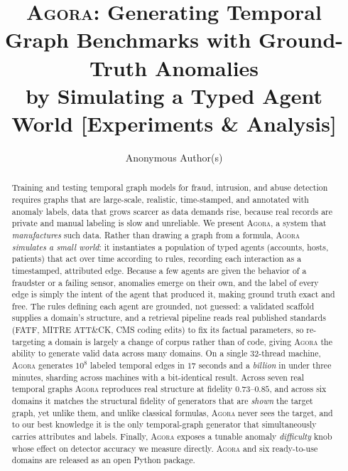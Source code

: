 \documentclass[sigconf,review,anonymous]{acmart}
\newcommand{\sys}{\textsc{Agora}\xspace}
\begin{document}
\title{\sys: Generating Temporal Graph Benchmarks with Ground-Truth Anomalies\\
by Simulating a Typed Agent World [Experiments \& Analysis]}

\author{Anonymous Author(s)}

\begin{abstract}
Training and testing temporal graph models for fraud, intrusion, and abuse detection
requires graphs that are large-scale, realistic, time-stamped, and annotated with
anomaly labels, data that grows scarcer as data demands rise, because real records
are private and manual labeling is slow and unreliable. We present \sys, a system that
\emph{manufactures} such data. Rather than drawing a graph from a formula, \sys{}
\emph{simulates a small world}: it instantiates a population of typed agents
(accounts, hosts, patients) that act over time according to rules, recording each
interaction as a timestamped, attributed edge. Because a few agents are given the
behavior of a fraudster or a failing sensor, anomalies emerge on their own, and the
label of every edge is simply the intent of the agent that produced it, making ground
truth exact and free. The rules defining each agent are grounded, not guessed: a
validated scaffold supplies a domain's structure, and a retrieval pipeline reads real
published standards (FATF, MITRE ATT\&CK, CMS coding edits) to fix its factual
parameters, so re-targeting a domain is largely a change of corpus rather than of
code, giving \sys{} the ability to generate valid data across many domains. On a
single 32-thread machine, \sys{} generates $10^8$ labeled temporal edges in $17$
seconds and a \emph{billion} in under three minutes, sharding across machines with a
bit-identical result. Across seven real temporal graphs \sys{}
reproduces real structure at fidelity $0.73$--$0.85$, and across six domains it matches
the structural fidelity of generators that are \emph{shown} the target graph, yet unlike them, and unlike
classical formulas, \sys{} never sees the target, and to our best knowledge it is the only temporal-graph
generator that simultaneously carries attributes and labels. Finally, \sys{} exposes a
tunable anomaly \emph{difficulty} knob whose effect on detector accuracy we measure
directly. \sys{} and six ready-to-use domains are released as an open Python package.
\end{abstract}

\end{document}

